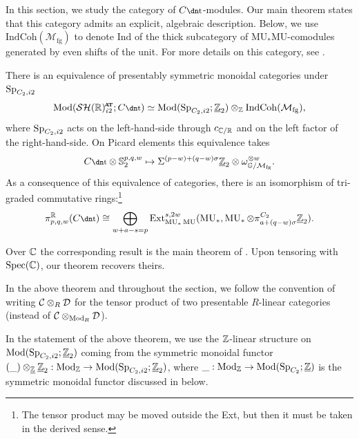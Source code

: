 In this section, we study the category of $C\ta$-modules.
Our main theorem states that this category admits an explicit, algebraic description.
Below, we use $\mathrm{IndCoh}(\mathcal{M}_{\mathrm{fg}})$ to denote $\mathrm{Ind}$ of the thick subcategory of $\mathrm{MU}_*\mathrm{MU}$-comodules generated by even shifts of the unit. For more details on this category, see .


\begin{thm} \label{thm:Cta}
  There is an equivalence of presentably symmetric monoidal categories under $\operatorname{\mathrm{Sp}}_{C_2, i2}$
  \begin{align} \Mod ( \SHR^{\at} _{i2} ; C\ta ) \simeq \Mod ( \Sp_{C_2, i2}; \uZt) \otimes_{\Z} \mathrm{IndCoh}(\mathcal{M}_{\mathrm{fg}}), \label{eqn:cta} \end{align}
  where $\operatorname{\mathrm{Sp}}_{C_2, i2}$ acts on the left-hand-side through $c_{\mathbb{C}/\mathbb{R}}$ and on the left factor of the right-hand-side. %
	On Picard elements this equivalence takes
  \[ C\ta \otimes \Ss_2^{p,q,w} \mapsto \Sigma^{(p-w)+(q-w)\sigma} \uZt \otimes \omega_{\mathbb{G}/\Mfg} ^{\otimes w}. \]
  As a consequence of this equivalence of categories, there is an isomorphism of tri-graded commutative rings:\footnote{The tensor product may be moved outside the Ext, but then it must be taken in the derived sense.}
  \[ \pi_{p,q,w}^\R(C\ta) \cong \bigoplus_{w+a-s = p} \Ext_{\MU_*\MU}^{s,2w}(\MU_*, \MU_* \otimes \pi_{a + (q-w) \sigma}^{C_2} \uZt). \]
\end{thm}

Over $\mathbb{C}$ the corresponding result is the main theorem of \cite{ctauactalol}.
Upon tensoring with $\operatorname{\mathrm{Spec}}(\mathbb{C})$, our theorem recovers theirs. %

\begin{ntn}
  In the above theorem and throughout the section, we follow the convention of writing $\mathcal{C} \otimes_R \operatorname{\mathcal{D}}$ for the tensor product of two presentable $R$-linear categories (instead of $\mathcal{C} \otimes_{\mathrm{Mod}_R} \operatorname{\mathcal{D}}$).
\end{ntn}

\begin{rmk}
  In the statement of the above theorem, we use the $\mathbb{Z}$-linear structure on $\mathrm{Mod}(\operatorname{\mathrm{Sp}}_{C_2, i2};\underline{\mathbb{Z}}_{2})$ coming from the symmetric monoidal functor $(\_) \otimes_{\underline{\mathbb{Z}}} \underline{\mathbb{Z}}_{2} : \mathrm{Mod}_{\mathbb{Z}} \to \mathrm{Mod}(\operatorname{\mathrm{Sp}}_{C_2, i2};\underline{\mathbb{Z}}_{2})$, where $\_ : \mathrm{Mod}_{\mathbb{Z}} \to \mathrm{Mod}(\operatorname{\mathrm{Sp}}_{C_2}; \underline{\mathbb{Z}})$ is the symmetric monoidal functor discussed in  below.
\end{rmk}

